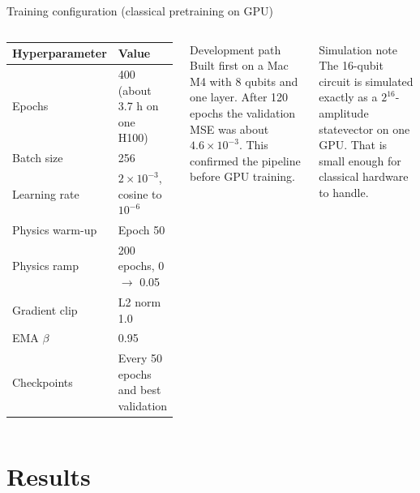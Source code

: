 \documentclass[aspectratio=169]{beamer}
\begin{document}
\begin{frame}{Training configuration (classical pretraining on GPU)}
\begin{columns}[T,onlytextwidth]
\begin{center}
\small
\begin{tabular}{ll}
\toprule
Hyperparameter & Value \\
\midrule
Epochs & 400 (about 3.7 h on one H100) \\
Batch size & 256 \\
Learning rate & $2\times10^{-3}$, cosine to $10^{-6}$ \\
Physics warm-up & Epoch 50 \\
Physics ramp & 200 epochs, 0 $\to$ 0.05 \\
Gradient clip & L2 norm 1.0 \\
EMA $\beta$ & 0.95 \\
Checkpoints & Every 50 epochs and best validation \\
\bottomrule
\end{tabular}
\end{center}
\begin{block}{Development path}
Built first on a Mac M4 with 8 qubits and one layer. After 120 epochs the validation MSE was about $4.6\times10^{-3}$. This confirmed the pipeline before GPU training.
\end{block}
\begin{block}{Simulation note}
The 16-qubit circuit is simulated exactly as a $2^{16}$-amplitude statevector on one GPU. That is small enough for classical hardware to handle.
\end{block}
\end{columns}
\end{frame}

\section{Results}
\end{document}
